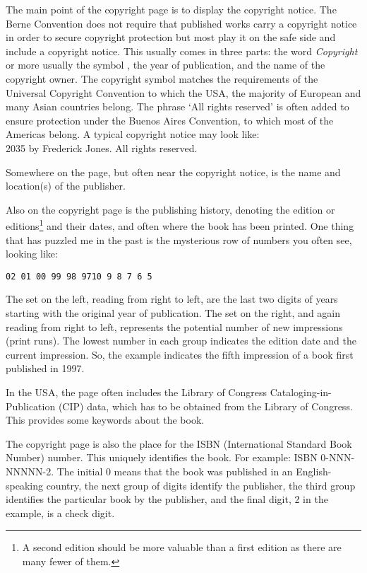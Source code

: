 \documentclass[10pt,letterpaper,extrafontsizes]{memoir}
\begin{document}
    The main point of the copyright page is to display the 
copyright notice.
The Berne Convention does not require that published works carry a copyright
notice in order to secure copyright protection but most play it on the safe
side and include a copyright notice.
This usually comes in three parts: the word \textit{Copyright} or more usually
the symbol \textcopyright, 
the year of publication, 
and the name of the copyright owner.
The copyright symbol matches the requirements of the Universal Copyright
Convention to which the USA, the majority of European and many Asian
countries belong.
The phrase `All rights reserved' is often added to ensure protection under the
Buenos Aires Convention, to which most of the Americas belong. A typical
copyright notice may look like: \\
{\footnotesize \textcopyright{} 2035 by Frederick Jones. All rights reserved.}

    Somewhere on the page, but often near the copyright notice, is the name 
and location(s) of the publisher.

    Also on the copyright page is the publishing history, denoting the edition
or editions\footnote{A second edition should be more valuable than a first
edition as there are many fewer of them.} and their dates, 
and often where the book has been printed. One thing that has puzzled me in
the past is the mysterious row of numbers you often see, looking like: \\
\centerline{\footnotesize\texttt{02 01 00 99 98 97\hspace{2em}10 9 8 7 6 5}}
The set on the left, reading from right to left, are the last two digits
of years starting with the original year of publication.
The set on the right, and again reading from right to left, represents the
potential number of new impressions (print runs). The lowest number in each 
group indicates the edition date and the current impression. So, the example
indicates the fifth impression of a book first published in 1997.

    In the USA, the page often includes the Library of Congress 
Cataloging-in-Publication (CIP) data, 
which has to be obtained from the
Library of Congress. This provides some keywords about the book.

    The copyright page is also the place for the ISBN 
(International
Standard Book Number) number. This uniquely identifies the book. For example:
ISBN 0-NNN-NNNNN-2. The initial 0 means that the book was published in an
English-speaking country, the next group of digits identify the publisher,
the third group identifies the particular book by the publisher, and the final
digit, 2 in the example, is a check digit.
\end{document}
